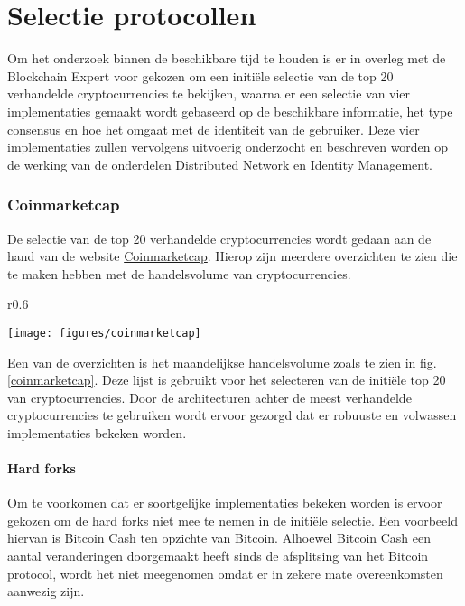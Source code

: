 \chapter{Selectie protocollen}

Om het onderzoek binnen de beschikbare tijd te houden is er in overleg met de Blockchain Expert voor gekozen om een initiële selectie van de top 20 verhandelde cryptocurrencies te bekijken, waarna er een selectie van vier implementaties gemaakt wordt gebaseerd op de beschikbare informatie, het type consensus en hoe het omgaat met de identiteit van de gebruiker. Deze vier implementaties zullen vervolgens uitvoerig onderzocht en beschreven worden op de werking van de onderdelen Distributed Network en Identity Management. 

\subsection{Coinmarketcap}

De selectie van de top 20 verhandelde cryptocurrencies wordt gedaan aan de hand van de website \href{https://coinmarketcap.com/}{Coinmarketcap}. Hierop zijn meerdere overzichten te zien die te maken hebben met de handelsvolume van cryptocurrencies.
\begin{wrapfigure}[17]{r}{0.6\textwidth}
  \begin{center}
    \texttt{[image: figures/coinmarketcap]}
    \caption[Snapshot Coinmarketcap] {
      Meest verhandelde cryptocurrencies in de maand februari zoals gepresenteerd op de website van Coinmarketcap.
    }
    \label{coinmarketcap}
  \end{center}
\end{wrapfigure}
Een van de overzichten is het maandelijkse handelsvolume zoals te zien in fig. \ref{coinmarketcap}. Deze lijst is gebruikt voor het selecteren van de initiële top 20 van cryptocurrencies. Door de architecturen achter de meest verhandelde cryptocurrencies te gebruiken wordt ervoor gezorgd dat er robuuste en volwassen implementaties bekeken worden.

\subsubsection{Hard forks}
Om te voorkomen dat er soortgelijke implementaties bekeken worden is ervoor gekozen om de hard forks niet mee te nemen in de initiële selectie. Een voorbeeld hiervan is Bitcoin Cash ten opzichte van Bitcoin. Alhoewel Bitcoin Cash een aantal veranderingen doorgemaakt heeft sinds de afsplitsing van het Bitcoin protocol, wordt het niet meegenomen omdat er in zekere mate overeenkomsten aanwezig zijn.

